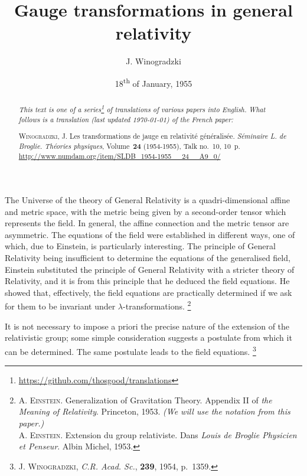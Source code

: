 \documentclass{article}
\theoremstyle{plain}
\theoremstyle{definition}
\newcommand{\oldpage}[1]{\marginpar{\footnotesize$\Big\vert$ \textit{p.~#1}}}
\begin{document}
\renewcommand{\abstractname}{Translator's note.}

\title{Gauge transformations in general relativity}
\author{J. Winogradzki}
\date{18\textsuperscript{th} of January, 1955}
\maketitle

\begin{abstract}
  \renewcommand*{\thefootnote}{\fnsymbol{footnote}}
  \emph{This text is one of a series\footnote{\url{https://github.com/thosgood/translations}} of translations of various papers into English.}
  \emph{What follows is a translation (last updated \today) of the French paper:}

  \medskip\noindent
  \textsc{Winogradzki, J}. Les transformations de jauge en relativité généralisée. \emph{Séminaire L. de Broglie. Théories physiques}, Volume~\textbf{24} (1954-1955), Talk no.~10, 10~p. {\footnotesize\url{http://www.numdam.org/item/SLDB_1954-1955__24__A9_0/}}
\end{abstract}

\setcounter{footnote}{0}

\tableofcontents



\bigskip\bigskip
\oldpage{10-01}
The Universe of the theory of General Relativity is a quadri-dimensional affine and metric space, with the metric being given by a second-order tensor which represents the field.
In general, the affine connection and the metric tensor are asymmetric.
The equations of the field were established in different ways, one of which, due to Einstein, is particularly interesting.
The principle of General Relativity being insufficient to determine the equations of the generalised field, Einstein substituted the principle of General Relativity with a stricter theory of Relativity, and it is from this principle that he deduced the field equations.
He showed that, effectively, the field equations are practically determined if we ask for them to be invariant under $\lambda$-transformations.
\footnote{\label{footnote1}\textsc{A. Einstein}. Generalization of Gravitation Theory. Appendix II of \emph{the Meaning of Relativity}. Princeton, 1953. \emph{(We will use the notation from this paper.)}\\\textsc{A. Einstein}. Extension du group relativiste. Dans \emph{Louis de Broglie Physicien et Penseur}. Albin Michel, 1953.}

It is not necessary to impose a priori the precise nature of the extension of the relativistic group; some simple consideration suggests a postulate from which it can be determined.
The same postulate leads to the field equations.
\footnote{\textsc{J. Winogradzki}, \emph{C.R. Acad. Sc.}, \textbf{239}, 1954, p.~1359.}
\end{document}
